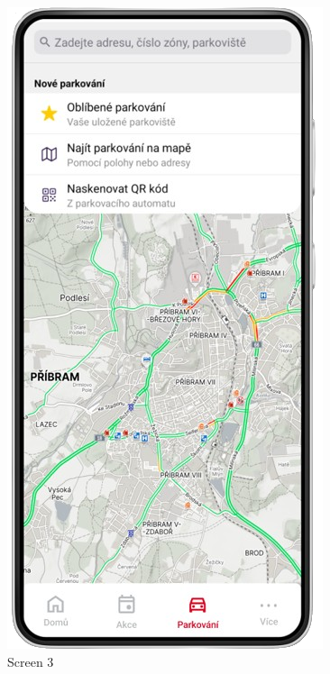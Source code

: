 \begin{figure}[H]
    \includegraphics[width=\linewidth]{screen3.png}
    \caption{Screen 3}\label{fig:screen3}
  \endminipage\hfill

\end{figure}
